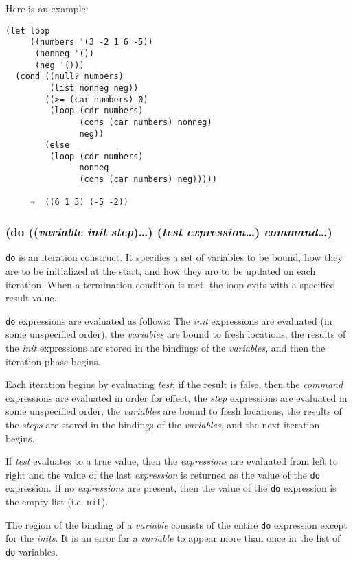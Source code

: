 \documentclass{article}
\begin{document}
Here is an example:

\begin{verbatim}
(let loop
     ((numbers '(3 -2 1 6 -5))
      (nonneg '())
      (neg '()))
  (cond ((null? numbers)
         (list nonneg neg))
        ((>= (car numbers) 0)
         (loop (cdr numbers)
               (cons (car numbers) nonneg)
               neg))
        (else
         (loop (cdr numbers)
               nonneg
               (cons (car numbers) neg)))))

     ⇒  ((6 1 3) (-5 -2))
\end{verbatim}

\subsubsection{(do ((\emph{variable} \emph{init} \emph{step})\ldots{}) (\emph{test} \emph{expression}\ldots{}) \emph{command}\ldots{})}

\verb|do| is an iteration construct. It specifies a set of variables to be bound, how they
are to be initialized at the start, and how they are to be updated on each iteration. When a
termination condition is met, the loop exits with a specified result value.

\verb|do| expressions are evaluated as follows: The \emph{init} expressions are evaluated
(in some unspecified order), the \emph{variables} are bound to fresh locations, the results of
the \emph{init} expressions are stored in the bindings of the \emph{variables}, and then the
iteration phase begins.

Each iteration begins by evaluating \emph{test}; if the result is false, then the
\emph{command} expressions are evaluated in order for effect, the \emph{step} expressions are
evaluated in some unspecified order, the \emph{variables} are bound to fresh locations, the
results of the \emph{steps} are stored in the bindings of the \emph{variables}, and the next
iteration begins.

If \emph{test} evaluates to a true value, then the \emph{expressions} are evaluated from left
to right and the value of the last \emph{expression} is returned as the value of the
\verb|do| expression. If no \emph{expressions} are present, then the value of the
\verb|do| expression is the empty list (i.e. \verb|nil|).

The region of the binding of a \emph{variable} consists of the entire \verb|do| expression
except for the \emph{inits}. It is an error for a \emph{variable} to appear more than once in
the list of \verb|do| variables.
\end{document}
